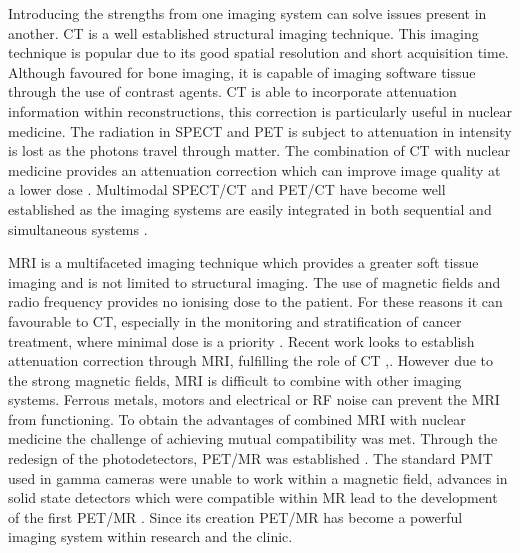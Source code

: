 Introducing the strengths from one imaging system can solve issues present in another. \acrlong{CT} is a well established structural imaging technique. This imaging technique is popular due to its good spatial resolution and short acquisition time. Although favoured for bone imaging, it is capable of imaging software tissue through the use of contrast agents. \acrshort{CT} is able to incorporate attenuation information within reconstructions, this correction is particularly useful in nuclear medicine. The radiation in \acrshort{SPECT} and \acrshort{PET} is subject to attenuation in intensity is lost as the photons travel through matter. The combination of \acrshort{CT} with nuclear medicine provides an attenuation correction which can improve image quality at a lower dose \cite{Blankespoor1996AttenuationAssessment}. Multimodal \acrshort{SPECT/CT} and \acrshort{PET/CT} have become well established as the imaging systems are easily integrated in both sequential and simultaneous systems \cite{Schillaci2005HybridImaging}.

\acrshort{MRI} is a multifaceted imaging technique which provides a greater soft tissue imaging and is not limited to structural imaging. The use of magnetic fields and radio frequency provides no ionising dose to the patient. For these reasons it can favourable to \acrshort{CT}, especially in the monitoring and stratification of cancer treatment, where minimal dose is a priority \cite{Cherry2009MultimodalitySPECT/CT}. Recent work looks to establish attenuation correction through \acrshort{MRI}, fulfilling the role of \acrshort{CT} \cite{Zaidi2007IsImaging},\cite{Hofmann2008MRI-basedRegistration}. However due to the strong magnetic fields, \acrshort{MRI} is difficult to combine with other imaging systems. Ferrous metals, motors and electrical or \acrshort{RF} noise can prevent the \acrshort{MRI} from functioning. To obtain the advantages of combined \acrshort{MRI} with nuclear medicine the challenge of achieving mutual compatibility was met. Through the redesign of the photodetectors, \acrshort{PET/MR} was established \cite{PICHLER2008199} \cite{Herbert2004FirstPhotomultiplier}. The standard \acrshort{PMT} used in gamma cameras were unable to work within a magnetic field, advances in solid state detectors which were compatible within \acrshort{MR} lead to the development of the first \acrshort{PET/MR} \cite{0031-9155-56-23-014}. Since its creation \acrshort{PET/MR} has become a powerful imaging system within research and the clinic. 

